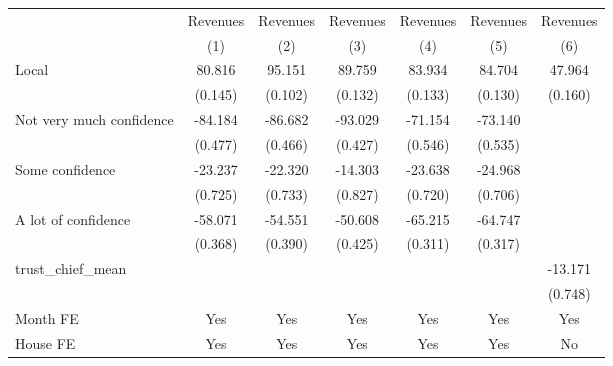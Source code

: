 {
\def\sym#1{\ifmmode^{#1}\else\(^{#1}\)\fi}
\begin{tabular}{l*{6}{c}}
\toprule
                &\multicolumn{1}{c}{Revenues}&\multicolumn{1}{c}{Revenues}&\multicolumn{1}{c}{Revenues}&\multicolumn{1}{c}{Revenues}&\multicolumn{1}{c}{Revenues}&\multicolumn{1}{c}{Revenues}\\
                &\multicolumn{1}{c}{(1)}         &\multicolumn{1}{c}{(2)}         &\multicolumn{1}{c}{(3)}         &\multicolumn{1}{c}{(4)}         &\multicolumn{1}{c}{(5)}         &\multicolumn{1}{c}{(6)}         \\
\midrule
Local           &   80.816         &   95.151         &   89.759         &   83.934         &   84.704         &   47.964         \\
                &  (0.145)         &  (0.102)         &  (0.132)         &  (0.133)         &  (0.130)         &  (0.160)         \\
Not very much confidence&  -84.184         &  -86.682         &  -93.029         &  -71.154         &  -73.140         &                  \\
                &  (0.477)         &  (0.466)         &  (0.427)         &  (0.546)         &  (0.535)         &                  \\
Some confidence &  -23.237         &  -22.320         &  -14.303         &  -23.638         &  -24.968         &                  \\
                &  (0.725)         &  (0.733)         &  (0.827)         &  (0.720)         &  (0.706)         &                  \\
A lot of confidence&  -58.071         &  -54.551         &  -50.608         &  -65.215         &  -64.747         &                  \\
                &  (0.368)         &  (0.390)         &  (0.425)         &  (0.311)         &  (0.317)         &                  \\
trust\_chief\_mean&                  &                  &                  &                  &                  &  -13.171         \\
                &                  &                  &                  &                  &                  &  (0.748)         \\
Month FE        &      Yes         &      Yes         &      Yes         &      Yes         &      Yes         &      Yes         \\
House FE        &      Yes         &      Yes         &      Yes         &      Yes         &      Yes         &       No         \\

\end{tabular}}
